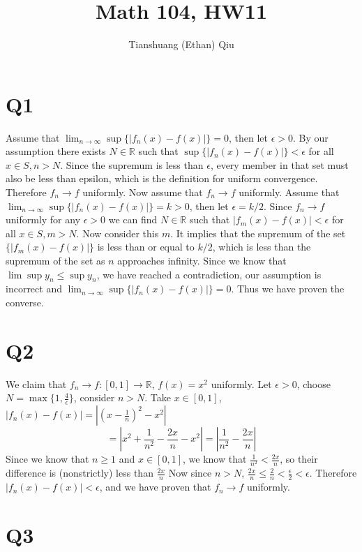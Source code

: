 \documentclass[12pt]{article}
\author{Tianshuang (Ethan) Qiu}
\newcommand{\R}{\mathbb{R}}
\begin{document}
\title{Math 104, HW11}
\maketitle
\newpage

\section{Q1}
Assume that $\lim_{n \to \infty} \sup \{|f_n(x)-f(x)|\} = 0$, then let $\epsilon > 0$. By our assumption there exists $N \in \R$ such that $\sup \{ |f_n(x) - f(x)| \}<\epsilon$ for all $x \in S, n > N$. Since the supremum is less than $\epsilon$, every member in that set must also be less than epsilon, which is the definition for uniform convergence. Therefore $f_n \to f$ uniformly.
\newline
Now assume that $f_n \to f$ uniformly. Assume that $\lim_{n \to \infty} \sup \{|f_n(x)-f(x)|\} = k > 0$, then let $\epsilon = k/2$. Since $f_n \to f$ uniformly for any $\epsilon > 0$ we can find $N \in \R$ such that $|f_m(x)-f(x)|<\epsilon$ for all $x \in S, m > N$.
Now consider this $m$. It implies that the supremum of the set $\{|f_m(x)-f(x)|\}$ is less than or equal to $k/2$, which is less than the supremum of the set as $n$ approaches infinity.
Since we know that $\lim \sup y_n \leq \sup y_n$, we have reached a contradiction, our assumption is incorrect and $\lim_{n \to \infty} \sup \{|f_n(x)-f(x)|\} = 0$. Thus we have proven the converse.
\newpage


\section{Q2}
We claim that $f_n \to f: [0,1] \to \R$, $f(x)=x^2$ uniformly.
\newline
Let $\epsilon > 0$, choose $N = \max \{1, \frac{4}{\epsilon}\}$, consider $n > N$. Take $x \in [0,1]$, $|f_n(x)-f(x)| = |(x-\frac{1}{n})^2-x^2|$
$$= |x^2+\frac{1}{n^2}-\frac{2x}{n}-x^2| = |\frac{1}{n^2}-\frac{2x}{n}|$$
Since we know that $n\geq 1$ and $x \in [0,1]$, we know that $\frac{1}{n^2} < \frac{2x}{n}$, so their difference is (nonstrictly) less than $\frac{2x}{n}$
\newline
Now since $n > N$, $\frac{2x}{n} \leq \frac{2}{n} < \frac{\epsilon}{2} < \epsilon$.
Therefore $|f_n(x)-f(x)|<\epsilon$, and we have proven that $f_n \to f$ uniformly.
\newpage


\section{Q3}
\end{document}
